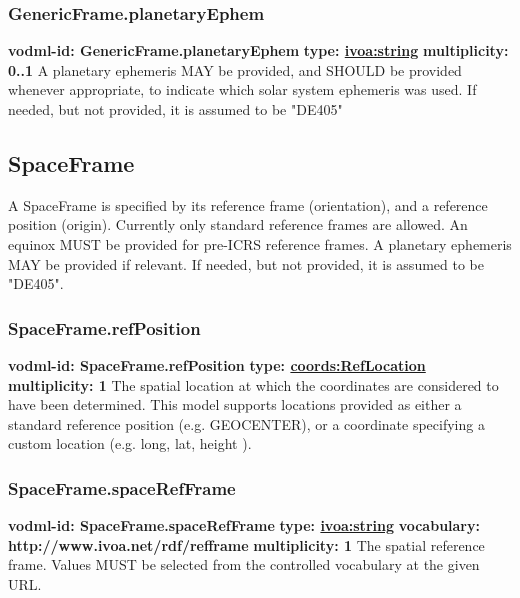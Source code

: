     \subsubsection{GenericFrame.planetaryEphem}
      \textbf{vodml-id: GenericFrame.planetaryEphem} \newline
      \textbf{type: \hyperref[sect:ivoa]{ivoa:string}} \newline
      \textbf{multiplicity: 0..1} \newline 
      A planetary ephemeris MAY be provided, and SHOULD be provided whenever appropriate, to indicate which solar system ephemeris was used. If needed, but not provided, it is assumed to be "DE405"

  \subsection{SpaceFrame}
  \label{sect:SpaceFrame}
    A SpaceFrame is specified by its reference frame (orientation), and a reference position (origin). Currently only standard reference frames are allowed. An equinox MUST be provided for pre-ICRS reference frames. A planetary ephemeris MAY be provided if relevant. If needed, but not provided, it is assumed to be "DE405".

    \subsubsection{SpaceFrame.refPosition}
      \textbf{vodml-id: SpaceFrame.refPosition} \newline
      \textbf{type: \hyperref[sect:RefLocation]{coords:RefLocation}} \newline
      \textbf{multiplicity: 1} \newline 
      The spatial location at which the coordinates are considered to have been determined. This model supports locations provided as either a standard reference position (e.g. GEOCENTER), or a coordinate specifying a custom location (e.g. long, lat, height ).

    \subsubsection{SpaceFrame.spaceRefFrame}
      \textbf{vodml-id: SpaceFrame.spaceRefFrame} \newline
      \textbf{type: \hyperref[sect:ivoa]{ivoa:string}} \newline
      \textbf{vocabulary: http://www.ivoa.net/rdf/refframe} \newline
      \textbf{multiplicity: 1} \newline
      The spatial reference frame. Values MUST be selected from the controlled vocabulary at the given URL.

